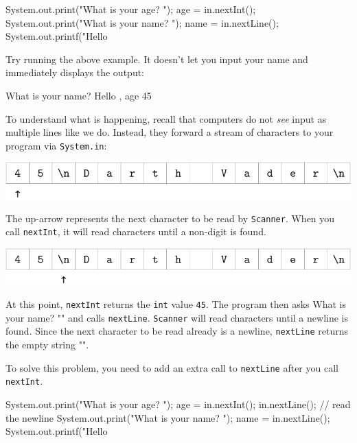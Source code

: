 \documentclass[12pt]{book}
\theoremstyle{exercise}
\newcommand{\java}[1]{\verb"#1"}
\newcommand{\java}[1]{\lstinline{#1}} %
\begin{document}
\begin{code}
    System.out.print("What is your age? ");
    age = in.nextInt();
    System.out.print("What is your name? ");
    name = in.nextLine();
    System.out.printf("Hello %
\end{code}

Try running the above example.
It doesn't let you input your name and immediately displays the output:

\begin{stdout}
What is your name? Hello , age 45
\end{stdout}

To understand what is happening, recall that computers do not {\em see} input as multiple lines like we do.
Instead, they forward a stream of characters to your program via \java{System.in}:

\begin{center}
\includegraphics{figs/vader1.pdf}
\end{center}

The up-arrow represents the next character to be read by \java{Scanner}.
When you call \java{nextInt}, it will read characters until a non-digit is found.

\begin{center}
\includegraphics{figs/vader2.pdf}
\end{center}

At this point, \java{nextInt} returns the \java{int} value \java{45}.
The program then asks \java{"What is your name? "} and calls \java{nextLine}.
\java{Scanner} will read characters until a newline is found.
Since the next character to be read already is a newline, \java{nextLine} returns the empty string \java{""}.

To solve this problem, you need to add an extra call to \java{nextLine} after you call \java{nextInt}.

\begin{code}
    System.out.print("What is your age? ");
    age = in.nextInt();
    in.nextLine();  // read the newline
    System.out.print("What is your name? ");
    name = in.nextLine();
    System.out.printf("Hello %
\end{code}
\end{document}
